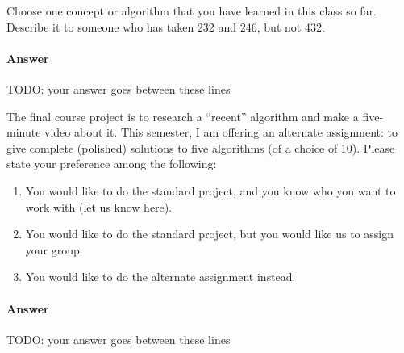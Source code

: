 \documentclass{article}
\begin{document}
\nextprob
{}

Choose one concept or algorithm that you have learned
in this class so far. Describe it to someone who has
taken 232 and 246, but not 432.

\paragraph{Answer}


TODO: your answer goes between these lines


\nextprob
{}

The final course project is to research a ``recent'' algorithm and make a
five-minute video about it.  This semester, I am offering an alternate
assignment: to give complete (polished) solutions to five algorithms (of a
choice of 10).
Please state your preference among the following:

\begin{enumerate}
    \item You would like to do the standard project, and you know who you want
        to work with (let us know here).
    \item You would like to do the standard project, but you would like us to
        assign your group.
    \item You would like to do the alternate assignment instead.
\end{enumerate}

\paragraph{Answer}


TODO: your answer goes between these lines

\end{document}
